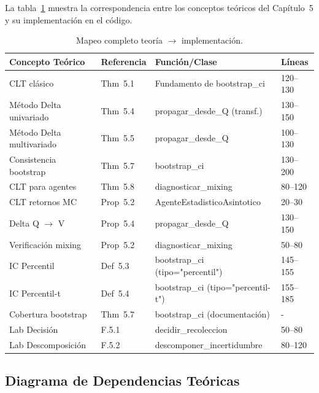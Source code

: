 \documentclass[12pt,a4paper]{article}
\begin{document}
La tabla~\ref{tab:mapeo} muestra la correspondencia entre los conceptos teóricos del Capítulo~5 y su implementación en el código.

\begin{table}[h]
	\centering
	\caption{Mapeo completo teoría $\to$ implementación.}
	\label{tab:mapeo}
	\begin{tabular}{@{}llll@{}}
		\toprule
		Concepto Teórico          & Referencia & Función/Clase                      & Líneas   \\
		\midrule
		CLT clásico               & Thm~5.1    & Fundamento de bootstrap\_ci        & 120--130 \\
		Método Delta univariado   & Thm~5.4    & propagar\_desde\_Q (transf.)       & 130--150 \\
		Método Delta multivariado & Thm~5.5    & propagar\_desde\_Q                 & 100--130 \\
		Consistencia bootstrap    & Thm~5.7    & bootstrap\_ci                      & 130--200 \\
		CLT para agentes          & Thm~5.8    & diagnosticar\_mixing               & 80--120  \\
		CLT retornos MC           & Prop~5.2   & AgenteEstadisticoAsintotico        & 20--30   \\
		Delta Q $\to$ V           & Prop~5.4   & propagar\_desde\_Q                 & 130--150 \\
		Verificación mixing       & Prop~5.2   & diagnosticar\_mixing               & 50--80   \\
		IC Percentil              & Def~5.3    & bootstrap\_ci (tipo="percentil")   & 145--155 \\
		IC Percentil-t            & Def~5.4    & bootstrap\_ci (tipo="percentil-t") & 155--185 \\
		Cobertura bootstrap       & Thm~5.7    & bootstrap\_ci (documentación)      & -        \\
		Lab Decisión              & F.5.1      & decidir\_recoleccion               & 50--80   \\
		Lab Descomposición        & F.5.2      & descomponer\_incertidumbre         & 80--120  \\
		\bottomrule
	\end{tabular}
\end{table}

\subsection{Diagrama de Dependencias Teóricas}
\end{document}
